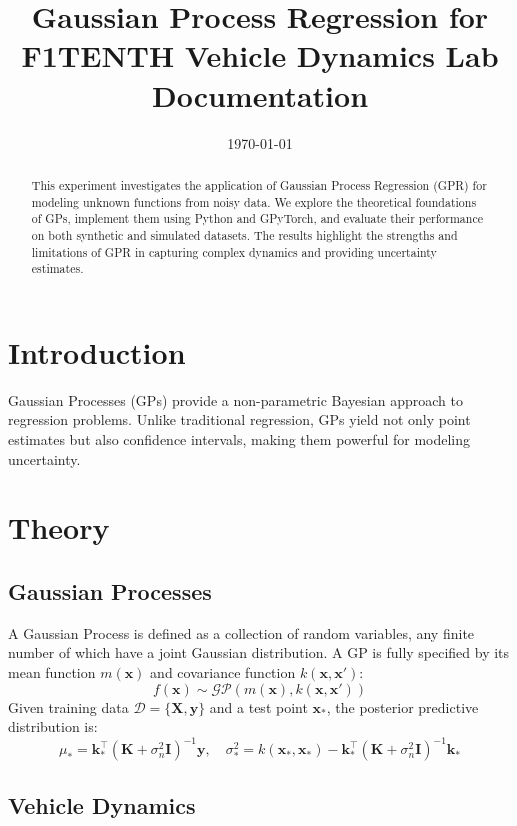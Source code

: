 \documentclass[12pt]{article}
\title{\textbf{Gaussian Process Regression for F1TENTH Vehicle Dynamics Lab Documentation}}
\date{\today}
\begin{document}
\maketitle

\begin{abstract}

This experiment investigates the application of Gaussian Process Regression (GPR) for modeling unknown functions from noisy data. We explore the theoretical foundations of GPs, implement them using Python and GPyTorch, and evaluate their performance on both synthetic and simulated datasets. The results highlight the strengths and limitations of GPR in capturing complex dynamics and providing uncertainty estimates.

\end{abstract}

\section{Introduction}
Gaussian Processes (GPs) provide a non-parametric Bayesian approach to regression problems. Unlike traditional regression, GPs yield not only point estimates but also confidence intervals, making them powerful for modeling uncertainty.

\section{Theory}

\subsection{Gaussian Processes}

A Gaussian Process is defined as a collection of random variables, any finite number of which have a joint Gaussian distribution. A GP is fully specified by its mean function $m(\mathbf{x})$ and covariance function $k(\mathbf{x}, \mathbf{x}')$:
\[
    f(\mathbf{x}) \sim \mathcal{GP}(m(\mathbf{x}), k(\mathbf{x}, \mathbf{x}'))
\]
Given training data $\mathcal{D} = \{\mathbf{X}, \mathbf{y}\}$ and a test point $\mathbf{x}_*$, the posterior predictive distribution is:
\[
    \mu_* = \mathbf{k}_*^\top(\mathbf{K} + \sigma_n^2 \mathbf{I})^{-1}\mathbf{y}, \quad
    \sigma_*^2 = k(\mathbf{x}_*, \mathbf{x}_*) - \mathbf{k}_*^\top(\mathbf{K} + \sigma_n^2 \mathbf{I})^{-1}\mathbf{k}_*
\]

\subsection{Vehicle Dynamics}
\end{document}
